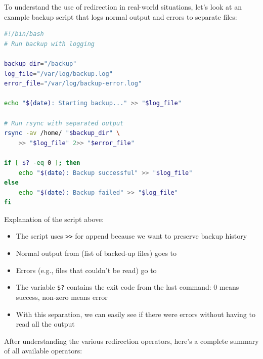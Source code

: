 \begin{examplebox}
	To understand the use of redirection in real-world situations, let's look at an example backup script that logs normal output and errors to separate files:

	\begin{lstlisting}[language=bash]
#!/bin/bash
# Run backup with logging

backup_dir="/backup"
log_file="/var/log/backup.log"
error_file="/var/log/backup-error.log"

echo "$(date): Starting backup..." >> "$log_file"

# Run rsync with separated output
rsync -av /home/ "$backup_dir" \
    >> "$log_file" 2>> "$error_file"

if [ $? -eq 0 ]; then
    echo "$(date): Backup successful" >> "$log_file"
else
    echo "$(date): Backup failed" >> "$log_file"
fi
\end{lstlisting}

	Explanation of the script above:
	\begin{itemize}
		\item The script uses \texttt{>>} for append because we want to preserve backup history
		\item Normal output from \cmd{rsync} (list of backed-up files) goes to 
		\item Errors (e.g., files that couldn't be read) go to \file{backup-error.log}
		\item The variable \texttt{\$?} contains the exit code from the last command: 0 means success, non-zero means error
		\item With this separation, we can easily see if there were errors without having to read all the output
	\end{itemize}
\end{examplebox}

After understanding the various redirection operators, here's a complete summary of all available operators:


